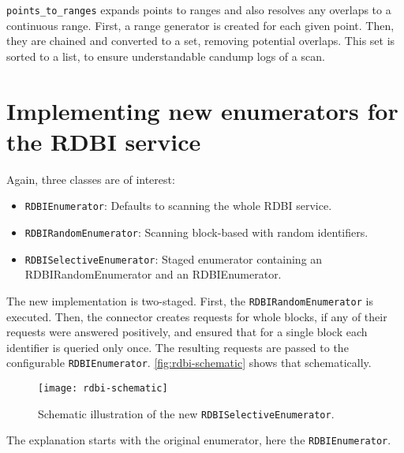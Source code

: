 \texttt{points_to_ranges} expands points to ranges and also resolves any overlaps to a continuous range.
First, a range generator is created for each given point. Then, they are chained and converted to a set, removing potential overlaps. This set is sorted to a list, to ensure understandable candump logs of a scan.

\section{Implementing new enumerators for the RDBI service}

Again, three classes are of interest:

\begin{itemize}
    \item \texttt{RDBIEnumerator}: Defaults to scanning the whole RDBI service.
    \item \texttt{RDBIRandomEnumerator}: Scanning block-based with random identifiers.
    \item \texttt{RDBISelectiveEnumerator}: Staged enumerator containing an RDBIRandomEnumerator and an RDBIEnumerator.
\end{itemize}

The new implementation is two-staged. First, the \texttt{RDBIRandomEnumerator} is executed. Then, the connector creates requests for whole blocks, if any of their requests were answered positively, and ensured that for a single block each identifier is queried only once. The resulting requests are passed to the configurable \texttt{RDBIEnumerator}. \autoref{fig:rdbi-schematic} shows that schematically.

\begin{figure}[htb]
    \centering
    \texttt{[image: rdbi-schematic]}
    \caption{Schematic illustration of the new \texttt{RDBISelectiveEnumerator}.}
    \label{fig:rdbi-schematic}
\end{figure}

The explanation starts with the original enumerator, here the \texttt{RDBIEnumerator}.


